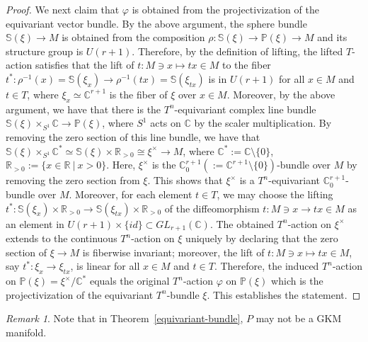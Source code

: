 \documentclass[12pt]{amsart}
\theoremstyle{definition}
\theoremstyle{remark}
\newtheorem{remark}[theorem]{Remark}
\numberwithin{equation}{section}
\begin{document}
\begin{proof}
We next claim that $\varphi$ is obtained from the projectivization of the equivariant vector bundle.
By the above argument,
the sphere bundle $\mathbb{S}(\xi)\to M$ is obtained from the composition $\rho:\mathbb{S}(\xi)\to \mathbb{P}(\xi)\to M$ and its structure group is $U(r+1)$.
Therefore, by the definition of lifting, the lifted $T$-action satisfies that the lift of $t:M\ni x\mapsto tx\in  M$ to the fiber $t^{*}:\rho^{-1}(x)=\mathbb{S}(\xi_{x})\to \rho^{-1}(tx)=\mathbb{S}(\xi_{tx})$ is in $U(r+1)$ for all $x\in M$ and $t\in T$, where $\xi_{x}\simeq \mathbb{C}^{r+1}$ is the fiber of $\xi$ over $x\in M$.
Moreover, by the above argument, we have that there is the $T^{n}$-equivariant complex line bundle $\mathbb{S}(\xi)\times_{S^{1}}\mathbb{C}\to \mathbb{P}(\xi)$, where $S^{1}$ acts on $\mathbb{C}$ by the scaler multiplication.
By removing the zero section of this line bundle, we have that $\mathbb{S}(\xi)\times_{S^{1}}\mathbb{C}^{*}\simeq \mathbb{S}(\xi)\times\mathbb{R}_{>0}\cong \xi^{\times}\to M$,
where $\mathbb{C}^{*}:=\mathbb{C}\setminus \{0\}$, $\mathbb{R}_{>0}:=\{x\in \mathbb{R}\ |\ x>0\}$. Here, $\xi^{\times}$ is the $\mathbb{C}_{0}^{r+1}(:=\mathbb{C}^{r+1}\setminus \{0\})$-bundle over $M$ by removing the zero section from $\xi$.
This shows that $\xi^{\times}$ is a $T^{n}$-equivariant $\mathbb{C}_{0}^{r+1}$-bundle over $M$.
Moreover, for each element $t\in T$, we may choose the lifting $t^{*}:\mathbb{S}(\xi_{x})\times \mathbb{R}_{>0}\to \mathbb{S}(\xi_{tx})\times \mathbb{R}_{>0}$ of the diffeomorphism $t:M\ni x\to tx\in M$ as an element in $U(r+1)\times \{id\}\subset GL_{r+1}(\mathbb{C})$.
The obtained $T^{n}$-action on $\xi^{\times}$ extends to the continuous $T^{n}$-action on $\xi$ uniquely by declaring that the zero section of $\xi\to M$ is fiberwise invariant; moreover, the lift of $t:M\ni x\mapsto tx\in  M$, say $t^{*}:\xi_{x}\to \xi_{tx}$, is linear for all $x\in M$ and $t\in T$.
Therefore, the induced $T^{n}$-action on $\mathbb{P}(\xi)=\xi^{\times}/\mathbb{C}^{*}$ equals the original $T^{n}$-action $\varphi$ on $\mathbb{P}(\xi)$ which is the projectivization of the equivariant $T^{n}$-bundle $\xi$.
This establishes the statement.
\end{proof}

\begin{remark}
\label{equivariant-bundle-remark}
Note that in Theorem~\ref{equivariant-bundle}, $P$ may not be a GKM manifold.
\end{remark}
\end{document}
